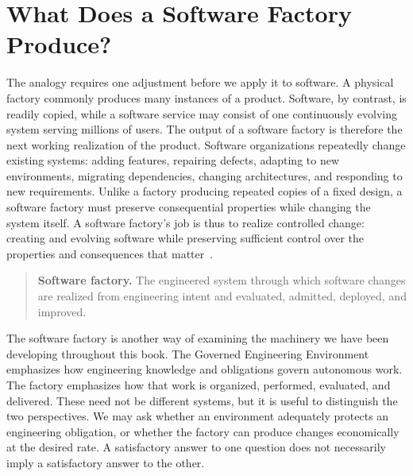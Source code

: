 \section{What Does a Software Factory Produce?}\label{heading:what-does-a-software-factory-produce}



The analogy requires one adjustment before we apply it to software. A physical factory commonly produces many instances of a product. Software, by contrast, is readily copied, while a software service may consist of one continuously evolving system serving millions of users. The output of a software factory is therefore the next working realization of the product. Software organizations repeatedly change existing systems: adding features, repairing defects, adapting to new environments, migrating dependencies, changing architectures, and responding to new requirements. Unlike a factory producing repeated copies of a fixed design, a software factory must preserve consequential properties while changing the system itself. A software factory's job is thus to realize controlled change: creating and evolving software while preserving sufficient control over the properties and consequences that matter~\citep{davis2026sehandbook}.

\begin{quote}
\textbf{Software factory.} The engineered system through which software changes are realized from engineering intent and evaluated, admitted, deployed, and improved.
\end{quote}

The software factory is another way of examining the machinery we have been developing throughout this book. The Governed Engineering Environment emphasizes how engineering knowledge and obligations govern autonomous work. The factory emphasizes how that work is organized, performed, evaluated, and delivered. These need not be different systems, but it is useful to distinguish the two perspectives. We may ask whether an environment adequately protects an engineering obligation, or whether the factory can produce changes economically at the desired rate. A satisfactory answer to one question does not necessarily imply a satisfactory answer to the other.

